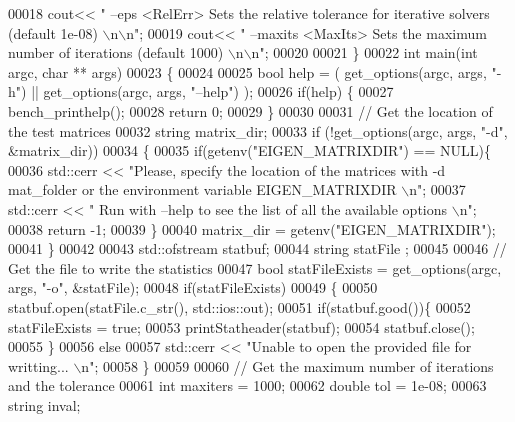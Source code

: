\begin{DoxyCode}
00018     cout<< \textcolor{stringliteral}{" --eps <RelErr> Sets the relative tolerance for iterative solvers (default 1e-08) \(\backslash\)n\(\backslash\)n"};
00019     cout<< \textcolor{stringliteral}{" --maxits <MaxIts> Sets the maximum number of iterations (default 1000) \(\backslash\)n\(\backslash\)n"};
00020     
00021 \}
00022 \textcolor{keywordtype}{int} main(\textcolor{keywordtype}{int} argc, \textcolor{keywordtype}{char} ** args)
00023 \{
00024   
00025   \textcolor{keywordtype}{bool} help = ( get\_options(argc, args, \textcolor{stringliteral}{"-h"}) || get\_options(argc, args, \textcolor{stringliteral}{"--help"}) );
00026   \textcolor{keywordflow}{if}(help) \{
00027     bench\_printhelp();
00028     \textcolor{keywordflow}{return} 0;
00029   \}
00030 
00031   \textcolor{comment}{// Get the location of the test matrices}
00032   \textcolor{keywordtype}{string} matrix\_dir;
00033   \textcolor{keywordflow}{if} (!get\_options(argc, args, \textcolor{stringliteral}{"-d"}, &matrix\_dir))
00034   \{
00035     \textcolor{keywordflow}{if}(getenv(\textcolor{stringliteral}{"EIGEN\_MATRIXDIR"}) == NULL)\{
00036       std::cerr << \textcolor{stringliteral}{"Please, specify the location of the matrices with -d mat\_folder or the environment
       variable EIGEN\_MATRIXDIR \(\backslash\)n"};
00037       std::cerr << \textcolor{stringliteral}{" Run with --help to see the list of all the available options \(\backslash\)n"};
00038       \textcolor{keywordflow}{return} -1;
00039     \}
00040     matrix\_dir = getenv(\textcolor{stringliteral}{"EIGEN\_MATRIXDIR"});
00041   \}
00042      
00043   std::ofstream statbuf;
00044   \textcolor{keywordtype}{string} statFile ;
00045   
00046   \textcolor{comment}{// Get the file to write the statistics}
00047   \textcolor{keywordtype}{bool} statFileExists = get\_options(argc, args, \textcolor{stringliteral}{"-o"}, &statFile);
00048   \textcolor{keywordflow}{if}(statFileExists)
00049   \{
00050     statbuf.open(statFile.c\_str(), std::ios::out);
00051     \textcolor{keywordflow}{if}(statbuf.good())\{
00052       statFileExists = \textcolor{keyword}{true}; 
00053       printStatheader(statbuf);
00054       statbuf.close();
00055     \}
00056     \textcolor{keywordflow}{else}
00057       std::cerr << \textcolor{stringliteral}{"Unable to open the provided file for writting... \(\backslash\)n"};
00058   \}       
00059   
00060   \textcolor{comment}{// Get the maximum number of iterations and the tolerance}
00061   \textcolor{keywordtype}{int} maxiters = 1000; 
00062   \textcolor{keywordtype}{double} tol = 1e-08; 
00063   \textcolor{keywordtype}{string} inval; 

\end{DoxyCode}
